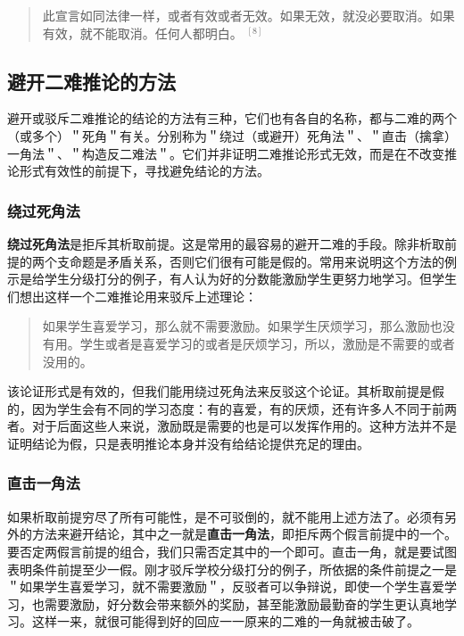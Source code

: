 \begin{quote}
此宣言如同法律一样，或者有效或者无效。如果无效，就没必要取消。如果有效，就不能取消。任何人都明白。 ${ }^{[8]}$
\end{quote}

\subsection{避开二难推论的方法}

避开或驳斥二难推论的结论的方法有三种，它们也有各自的名称，都与二难的两个（或多个）＂死角＂有关。分别称为＂绕过（或避开）死角法＂、＂直击（擒拿）一角法＂、＂构造反二难法＂。它们并非证明二难推论形式无效，而是在不改变推论形式有效性的前提下，寻找避免结论的方法。

\subsubsection{绕过死角法}

\textbf{绕过死角法}是拒斥其析取前提。这是常用的最容易的避开二难的手段。除非析取前提的两个支命题是矛盾关系，否则它们很有可能是假的。常用来说明这个方法的例示是给学生分级打分的例子，有人认为好的分数能激励学生更努力地学习。但学生们想出这样一个二难推论用来驳斥上述理论：

\begin{quote}
如果学生喜爱学习，那么就不需要激励。如果学生厌烦学习，那么激励也没有用。学生或者是喜爱学习的或者是厌烦学习，所以，激励是不需要的或者没用的。
\end{quote}

该论证形式是有效的，但我们能用绕过死角法来反驳这个论证。其析取前提是假的，因为学生会有不同的学习态度：有的喜爱，有的厌烦，还有许多人不同于前两者。对于后面这些人来说，激励既是需要的也是可以发挥作用的。这种方法并不是证明结论为假，只是表明推论本身并没有给结论提供充足的理由。

\subsubsection{直击一角法}

如果析取前提穷尽了所有可能性，是不可驳倒的，就不能用上述方法了。必须有另外的方法来避开结论，其中之一就是\textbf{直击一角法}，即拒斥两个假言前提中的一个。要否定两假言前提的组合，我们只需否定其中的一个即可。直击一角，就是要试图表明条件前提至少一假。刚才驳斥学校分级打分的例子，所依据的条件前提之一是＂如果学生喜爱学习，就不需要激励＂，反驳者可以争辩说，即使一个学生喜爱学习，也需要激励，好分数会带来额外的奖励，甚至能激励最勤奋的学生更认真地学习。这样一来，就很可能得到好的回应一一原来的二难的一角就被击破了。

